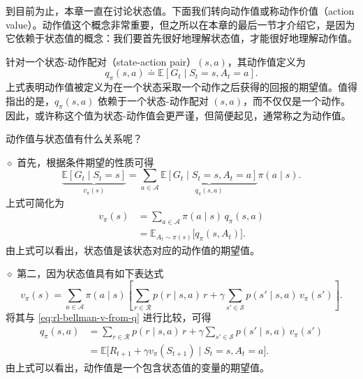 到目前为止，本章一直在讨论状态值。下面我们转向动作值或称动作价值（action value）。动作值这个概念非常重要，但之所以在本章的最后一节才介绍它，是因为它依赖于状态值的概念：我们要首先很好地理解状态值，才能很好地理解动作值。

针对一个状态-动作配对（state-action pair）$(s, a)$，其动作值定义为
\begin{equation}
q_\pi(s, a) \doteq \mathbb{E}[G_t \mid S_t = s, A_t = a].
\label{eq:rl-bellman-action-value-def}
\end{equation}
上式表明动作值被定义为在一个状态采取一个动作之后获得的回报的期望值。值得指出的是，$q_\pi(s, a)$ 依赖于一个状态-动作配对 $(s, a)$，而不仅仅是一个动作。因此，或许称这个值为状态-动作值会更严谨，但简便起见，通常称之为动作值。

动作值与状态值有什么关系呢？

\medskip
$\diamond$ 首先，根据条件期望的性质可得
\begin{equation*}
\underbrace{\mathbb{E}[G_t \mid S_t = s]}_{v_\pi(s)} = \sum_{a \in \mathcal{A}} \underbrace{\mathbb{E}[G_t \mid S_t = s, A_t = a]}_{q_\pi(s, a)} \pi(a \mid s).
\end{equation*}
上式可简化为
\begin{equation}
\begin{aligned}
v_\pi(s) &= \sum_{a \in \mathcal{A}} \pi(a \mid s) \, q_\pi(s, a) \\
&= \mathbb{E}_{A_t \sim \pi(s)} \big[ q_\pi(s, A_t) \big].
\end{aligned}
\label{eq:rl-bellman-v-from-q}
\end{equation}
由上式可以看出，状态值是该状态对应的动作值的期望值。

\medskip
$\diamond$ 第二，因为状态值具有如下表达式
\begin{equation*}
v_\pi(s) = \sum_{a \in \mathcal{A}} \pi(a \mid s) \left[ \sum_{r \in \mathcal{R}} p(r \mid s, a) \, r + \gamma \sum_{s' \in \mathcal{S}} p(s' \mid s, a) \, v_\pi(s') \right].
\end{equation*}
将其与 \cref{eq:rl-bellman-v-from-q} 进行比较，可得
\begin{equation}
\begin{aligned}
q_\pi(s, a) &= \sum_{r \in \mathcal{R}} p(r \mid s, a) \, r + \gamma \sum_{s' \in \mathcal{S}} p(s' \mid s, a) \, v_\pi(s') \\
&= \mathbb{E}\big[ R_{t+1} + \gamma v_\pi(S_{t+1}) \mid S_t = s, A_t = a \big].
\end{aligned}
\label{eq:rl-bellman-q-from-v}
\end{equation}
由上式可以看出，动作值是一个包含状态值的变量的期望值。

